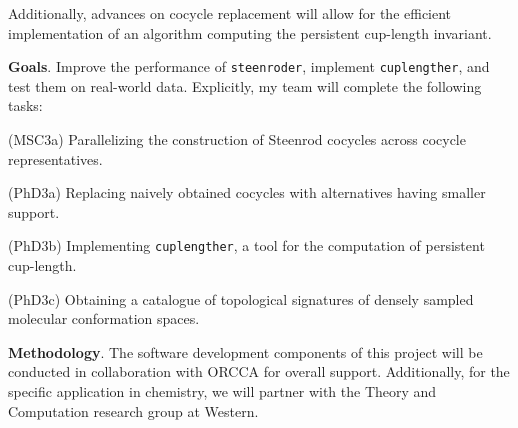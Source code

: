 Additionally, advances on cocycle replacement will allow for the efficient implementation of an algorithm computing the persistent cup-length invariant.

\medskip\noindent\textbf{Goals}.
Improve the performance of \texttt{steenroder}, implement \texttt{cuplengther}, and test them on real-world data.
Explicitly, my team will complete the following tasks:

\smallskip\noindent(MSC3a)
Parallelizing the construction of Steenrod cocycles across cocycle representatives.

\smallskip\noindent(PhD3a)
Replacing naively obtained cocycles with alternatives having smaller support.

\smallskip\noindent(PhD3b) Implementing \texttt{cuplengther}, a tool for the computation of persistent cup-length.

\smallskip\noindent(PhD3c)
Obtaining a catalogue of topological signatures of densely sampled molecular conformation spaces.

\smallskip\noindent\textbf{Methodology}.
The software development components of this project will be conducted in collaboration with ORCCA for overall support.
Additionally, for the specific application in chemistry, we will partner with the Theory and Computation research group at Western.
